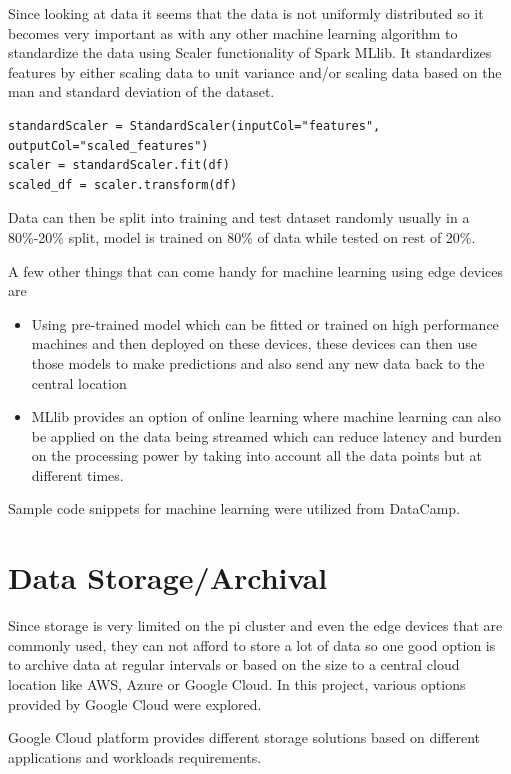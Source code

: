 Since looking at data it seems that the data is not uniformly distributed so it becomes very important as with any other machine learning algorithm to standardize the data using Scaler functionality of Spark MLlib. It standardizes features by either scaling data to unit variance and/or scaling data based on the man and standard deviation of the dataset. 

\begin{verbatim}
standardScaler = StandardScaler(inputCol="features", outputCol="scaled_features")
scaler = standardScaler.fit(df)
scaled_df = scaler.transform(df)
\end{verbatim}

Data can then be split into training and test dataset randomly usually in a 80\%-20\% split, model is trained on 80\% of data while tested on rest of 20\%. 

A few other things that can come handy for machine learning using edge devices are

\begin{itemize}
\item Using pre-trained model which can be fitted or trained on high performance machines and then deployed on these devices, these devices can then use those models to make predictions and also send any new data back to the central location
\item MLlib provides an option of online learning where machine learning can also be applied on the data being streamed which can reduce latency and burden on the processing power by taking into account all the data points but at different times.
\end{itemize}

Sample code snippets for machine learning were utilized from DataCamp\cite{hid-sp18-510-dc}. 

\section{Data Storage/Archival}
Since storage is very limited on the pi cluster and even the edge devices that are commonly used, they can not afford to store a lot of data so one good option is to archive data at regular intervals or based on the size to a central cloud location like AWS, Azure or Google Cloud. In this project, various options provided by Google Cloud were explored.

Google Cloud platform provides different storage solutions based on different applications and workloads requirements. 


